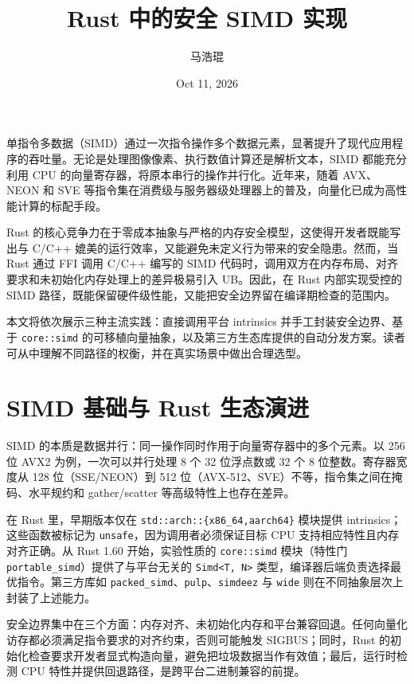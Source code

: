 \title{Rust 中的安全 SIMD 实现}
\author{马浩琨}
\date{Oct 11, 2026}
\maketitle
单指令多数据（SIMD）通过一次指令操作多个数据元素，显著提升了现代应用程序的吞吐量。无论是处理图像像素、执行数值计算还是解析文本，SIMD 都能充分利用 CPU 的向量寄存器，将原本串行的操作并行化。近年来，随着 AVX、NEON 和 SVE 等指令集在消费级与服务器级处理器上的普及，向量化已成为高性能计算的标配手段。\par
Rust 的核心竞争力在于零成本抽象与严格的内存安全模型，这使得开发者既能写出与 C/C++ 媲美的运行效率，又能避免未定义行为带来的安全隐患。然而，当 Rust 通过 FFI 调用 C/C++ 编写的 SIMD 代码时，调用双方在内存布局、对齐要求和未初始化内存处理上的差异极易引入 UB。因此，在 Rust 内部实现受控的 SIMD 路径，既能保留硬件级性能，又能把安全边界留在编译期检查的范围内。\par
本文将依次展示三种主流实践：直接调用平台 intrinsics 并手工封装安全边界、基于 \texttt{core::simd} 的可移植向量抽象，以及第三方生态库提供的自动分发方案。读者可从中理解不同路径的权衡，并在真实场景中做出合理选型。\par
\chapter{SIMD 基础与 Rust 生态演进}
SIMD 的本质是数据并行：同一操作同时作用于向量寄存器中的多个元素。以 256 位 AVX2 为例，一次可以并行处理 8 个 32 位浮点数或 32 个 8 位整数。寄存器宽度从 128 位（SSE/NEON）到 512 位（AVX-512、SVE）不等，指令集之间在掩码、水平规约和 gather/scatter 等高级特性上也存在差异。\par
在 Rust 里，早期版本仅在 \texttt{std::arch::\{{}x86\_{}64,aarch64\}{}} 模块提供 intrinsics；这些函数被标记为 \texttt{unsafe}，因为调用者必须保证目标 CPU 支持相应特性且内存对齐正确。从 Rust 1.60 开始，实验性质的 \texttt{core::simd} 模块（特性门 \texttt{portable\_{}simd}）提供了与平台无关的 \texttt{Simd<T, N>} 类型，编译器后端负责选择最优指令。第三方库如 \texttt{packed\_{}simd}、\texttt{pulp}、\texttt{simdeez} 与 \texttt{wide} 则在不同抽象层次上封装了上述能力。\par
安全边界集中在三个方面：内存对齐、未初始化内存和平台兼容回退。任何向量化访存都必须满足指令要求的对齐约束，否则可能触发 SIGBUS；同时，Rust 的初始化检查要求开发者显式构造向量，避免把垃圾数据当作有效值；最后，运行时检测 CPU 特性并提供回退路径，是跨平台二进制兼容的前提。\par
